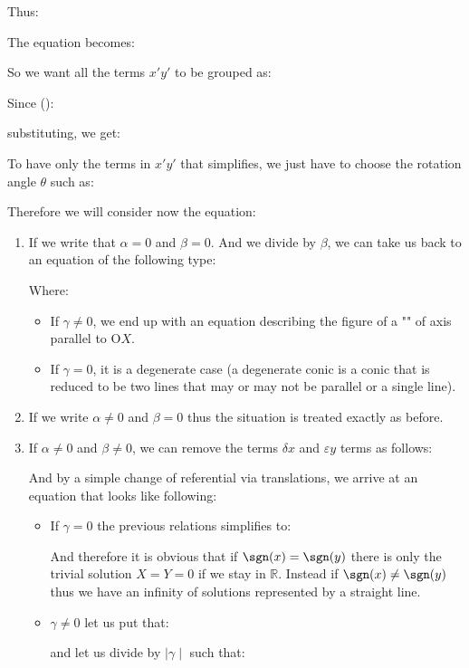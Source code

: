Thus:
	
The equation becomes:
	
So we want all the terms $x'y'$ to be grouped as:
	
Since ():
	
substituting, we get:
	
To have only the terms in $x'y'$ that simplifies, we just have to choose the rotation angle $\theta$ such as:
	
Therefore we will consider now the equation:
	
	\begin{enumerate}
		\item If we write that $\alpha=0$ and  $\beta=0$. And we divide by $\beta$, we can take us back to an equation of the following type:
		
	Where:
		\begin{itemize}
			\item If $\gamma\neq 0$, we end up with an equation describing the figure of a "" of axis parallel to $\text{O}X$.
			\item If $\gamma = 0$, it is a degenerate case (a degenerate conic is a conic that is reduced to be two lines that may or may not be parallel or a single line).
		\end{itemize}
	\item If we write $\alpha \neq 0$ and $\beta = 0$ thus the situation is treated exactly as before.
	
	\item If $\alpha \neq 0$ and  $\beta \neq 0$, we can remove the terms $\delta x$ and $\varepsilon y$ terms as follows:
	
	
	And by a simple change of referential via translations, we arrive at an equation that looks like following:
		
		\begin{itemize}
			\item If $\gamma=0$ the previous relations simplifies to:
				
				And therefore it is obvious that if $\sgn(x)=\sgn(y)$ there is only the trivial solution $X=Y=0$ if we stay in $\mathbb{R}$. Instead if $\sgn(x) \neq \sgn(y)$ thus we have an infinity of solutions represented by a straight line.
			\item $\gamma \neq 0$ let us put that:
				
			and let us divide by $\mid \gamma \mid$ such that:
				

\end{itemize}
\end{enumerate}
